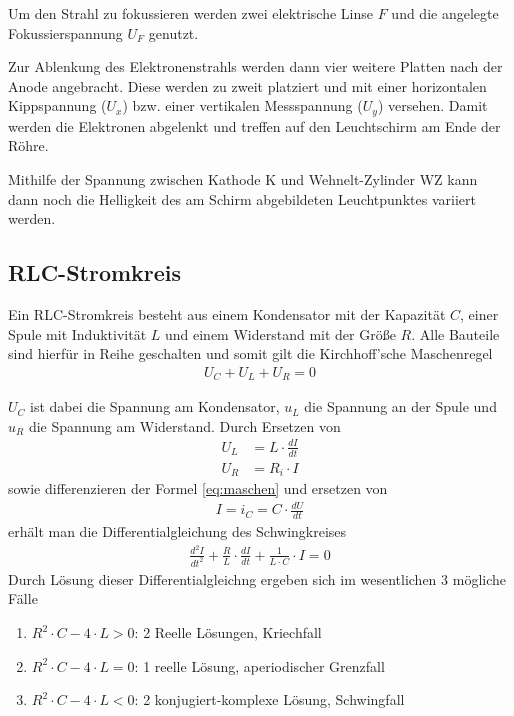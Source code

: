 \documentclass{article}
\begin{document}
Um den Strahl zu fokussieren werden zwei elektrische Linse $F$ und die angelegte Fokussierspannung $U_F$ genutzt.


Zur Ablenkung des Elektronenstrahls werden dann vier weitere Platten nach der Anode angebracht. Diese werden zu zweit platziert und mit einer horizontalen Kippspannung ($U_x$) bzw. einer vertikalen Messspannung ($U_y$) versehen. Damit werden die Elektronen abgelenkt und treffen auf den Leuchtschirm am Ende der Röhre.

Mithilfe der Spannung zwischen Kathode K und Wehnelt-Zylinder WZ kann dann noch die Helligkeit des am Schirm abgebildeten Leuchtpunktes variiert werden. \cite{braun} \cite{uniunterlagen}

\subsection{RLC-Stromkreis}

Ein RLC-Stromkreis besteht aus einem Kondensator mit der Kapazität $C$, einer Spule mit Induktivität $L$ und einem Widerstand mit der Größe $R$. Alle Bauteile sind hierfür in Reihe geschalten und somit gilt die Kirchhoff'sche Maschenregel
\begin{align}
\label{eq:maschen}
U_C + U_L + U_R = 0
\end{align}

$U_C$ ist dabei die Spannung am Kondensator, $u_L$ die Spannung an der Spule und $u_R$ die Spannung am Widerstand. Durch Ersetzen von 
\begin{align*}
U_L &= L \cdot \frac{dI}{dt} \\
U_R &= R_i \cdot I
\end{align*}
sowie differenzieren der Formel \eqref{eq:maschen} und ersetzen von 
\begin{align*}
I = i_C = C \cdot \frac{dU}{dt}
\end{align*}
 erhält man die Differentialgleichung des Schwingkreises
\begin{align}
\frac{d^2I}{dt^2} + \frac{R}{L}\cdot \frac{dI}{dt} + \frac{1}{L\cdot C}\cdot I = 0
\end{align}
Durch Lösung dieser Differentialgleichng ergeben sich im wesentlichen 3 mögliche Fälle
\begin{enumerate}
\item $R^2\cdot C - 4\cdot L > 0$: 2 Reelle Lösungen, Kriechfall
\item $R^2\cdot C - 4\cdot L = 0$: 1 reelle Lösung, aperiodischer Grenzfall
\item $R^2\cdot C - 4\cdot L < 0$: 2 konjugiert-komplexe Lösung, Schwingfall
\end{enumerate}
\end{document}

